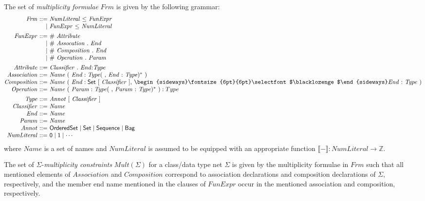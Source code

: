 \documentclass[10pt,fleqn,%
\ifpretendfinal
final%
\else
draft%
\fi,
]{scrreprt}
\newcommand{\composition}{\raisebox{0.2pt}{\begin{sideways}\fontsize{6pt}{6pt}\selectfont$\blacklozenge$\end{sideways}}}
\newcommand{\NZ}{\mathbb{Z}}
\newcommand{\sem}[1]{\mathopen\llbracket#1\mathclose\rrbracket}
\begin{document}
The set of \emph{multiplicity formulae} $\mathit{Frm}$ is given by
the following grammar:
%
\begin{equation*}
\begin{array}{@{}r@{\ }r@{\ }l@{}}
  \mathit{Frm} & ::= & \mathit{NumLiteral}\ \mathsf{\leq}\ \mathit{FunExpr}\\
               &   | & \mathit{FunExpr}\ \mathsf{\leq}\ \mathit{NumLiteral}
\\[1ex]
  \mathit{FunExpr} & ::= & \mathit{\#}\ \mathit{Attribute}\\
                   &   | & \mathit{\#}\ \mathit{Assocation}\ \mathsf{.}\ \mathit{End}\\
                   &   | & \mathit{\#}\ \mathit{Composition}\ \mathsf{.}\ \mathit{End}
\\
                   &   | & \mathit{\#}\ \mathit{Operation}\ \mathsf{.}\ \mathit{Param}
\\[1ex]
  \mathit{Attribute} & ::= & \mathit{Classifier}\ \mathsf{.}\ \mathit{End} \mathsf{:} \mathit{Type}
\\
  \mathit{Association} & ::= & \mathit{Name}\ (\ \mathit{End} : \mathit{Type}(\ \mathsf{,}\ \mathit{End}\ \mathsf{:}\ \mathit{Type})^*\ )
\\
  \mathit{Composition} & ::= & \mathit{Name}\ (\ \mathit{End} : \mathsf{Set}\ [\ \mathit{Classifier}\ ]\mathsf{,}\ \composition \mathit{End}\ \mathsf{:}\ \mathit{Type}\ )
\\
  \mathit{Operation} & ::= & \mathit{Name}\ (\ \mathit{Param} : \mathit{Type}(\ \mathsf{,}\ \mathit{Param}\ \mathsf{:}\ \mathit{Type})^*\ ) : Type
\\[1ex]
  \mathit{Type} & ::= & \mathit{Annot}\ \mathsf{[}\ \mathit{Classifier}\ \mathsf{]}
\\
  \mathit{Classifier} & ::= & \mathit{Name}
\\
  \mathit{End} & ::= & \mathit{Name}
\\
  \mathit{Param} & ::= & \mathit{Name}
\\
  \mathit{Annot} & ::= & \mathsf{OrderedSet} \mid \mathsf{Set} \mid \mathsf{Sequence} \mid \mathsf{Bag}
\\
  \mathit{NumLiteral} & ::= & \mathsf{0} \mid \mathsf{1} \mid \cdots
\end{array}
\end{equation*}
%
where $\mathit{Name}$ is a set of names and $\mathit{NumLiteral}$ is
assumed to be equipped with an appropriate function
$\sem{-} : \mathit{NumLiteral} \to \NZ$.

The set of $\Sigma$-\emph{multiplicity constraints}
$\mathit{Mult}(\Sigma)$ for a class/data type net $\Sigma$ is given by the
multiplicity formulae in $\mathit{Frm}$ such that all mentioned elements
of $\mathit{Association}$ and $\mathit{Composition}$ correspond to
association declarations and composition declarations of $\Sigma$,
respectively, and the member end name mentioned in the clauses of
$\mathit{FunExpr}$ occur in the mentioned association and composition,
respectively.
\end{document}
